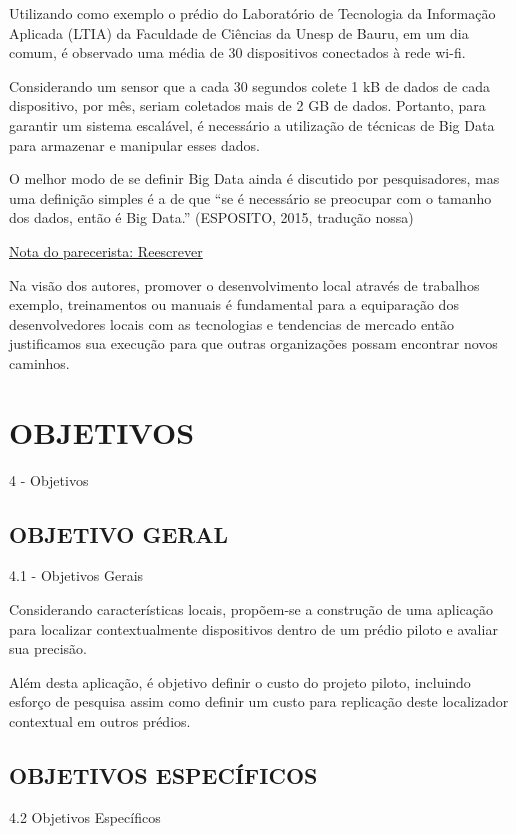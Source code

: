 \documentclass[
	12pt,				%
	openright,			%
	oneside,			%
	a4paper,			%
	chapter=TITLE,		%
	english,			%
	french,				%
	spanish,			%
	brazil				%
	]{abntex2}
\begin{document}
{Utilizando como exemplo o prédio do Laboratório de Tecnologia da Informação
Aplicada (LTIA) da Faculdade de Ciências da Unesp de Bauru, em um dia comum, é
observado uma média de 30 dispositivos conectados à rede wi-fi.

Considerando um sensor que a cada 30 segundos colete 1 kB de dados de cada
dispositivo, por mês, seriam coletados mais de 2 GB de dados. Portanto, para
garantir um sistema escalável, é necessário a utilização de técnicas de Big Data
para armazenar e manipular esses dados.

O melhor modo de se definir Big Data ainda é discutido por pesquisadores, mas
uma definição simples é a de que “se é necessário se preocupar com o tamanho dos
dados, então é Big Data.” (ESPOSITO, 2015, tradução nossa)

\underline{Nota do parecerista: Reescrever}

Na visão dos autores, promover o desenvolvimento local através de trabalhos
exemplo, treinamentos ou manuais é fundamental para a equiparação dos
desenvolvedores locais com as tecnologias e tendencias de mercado então
justificamos sua execução para que outras organizações possam encontrar novos
caminhos.

\chapter{OBJETIVOS}
\label{chap:OBJETIVOS}

 4 - Objetivos

\section{OBJETIVO GERAL}
\label{sec:OBJETIVO GERAL}

 4.1 - Objetivos Gerais

Considerando características locais, propõem-se a construção de uma aplicação
para localizar contextualmente dispositivos dentro de um prédio piloto e avaliar
sua precisão.

Além desta aplicação, é objetivo definir o custo do projeto piloto, incluindo
esforço de pesquisa assim como definir um custo para replicação deste
localizador contextual em outros prédios.

\section{OBJETIVOS ESPECÍFICOS}
\label{sec:OBJETIVOS ESPECÍFICOS}

 4.2 Objetivos Específicos

}
\end{document}
